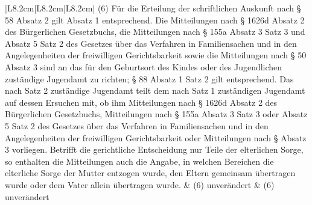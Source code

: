 \documentclass[10pt,a4paper,landscape]{article}
\begin{document}
\begin{longtable}{|L{8.2cm}|L{8.2cm}|L{8.2cm}|}
(6) Für die Erteilung der schriftlichen  \newline Auskunft nach \S{} 58 Absatz 2 gilt Absatz 1  \newline entsprechend. Die Mitteilungen nach \S{}  \newline 1626d Absatz 2 des Bürgerlichen  \newline Gesetzbuchs, die Mitteilungen nach \S{} 155a  \newline Absatz 3 Satz 3 und Absatz 5 Satz 2 des  \newline Gesetzes über das Verfahren in  \newline Familiensachen und in den  \newline Angelegenheiten der freiwilligen  \newline Gerichtsbarkeit sowie die Mitteilungen nach  \newline \S{} 50 Absatz 3 sind an das für den  \newline Geburtsort des Kindes oder des  \newline Jugendlichen zuständige Jugendamt zu  \newline richten; \S{} 88 Absatz 1 Satz 2 gilt  \newline entsprechend. Das nach Satz 2 zuständige  \newline Jugendamt teilt dem nach Satz 1  \newline zuständigen Jugendamt auf dessen  \newline Ersuchen mit, ob ihm Mitteilungen nach \S{}  \newline 1626d Absatz 2 des Bürgerlichen  \newline Gesetzbuchs, Mitteilungen nach \S{} 155a  \newline Absatz 3 Satz 3 oder Absatz 5 Satz 2 des  \newline Gesetzes über das Verfahren in  \newline Familiensachen und in den  \newline Angelegenheiten der freiwilligen  \newline Gerichtsbarkeit oder Mitteilungen nach \S{}   Absatz 3 vorliegen. Betrifft die  \newline gerichtliche Entscheidung nur Teile der  \newline elterlichen Sorge, so enthalten die  \newline Mitteilungen auch die Angabe, in welchen  \newline Bereichen die elterliche Sorge der Mutter  \newline entzogen wurde, den Eltern gemeinsam  \newline übertragen wurde oder dem Vater allein  \newline übertragen wurde. & (6) unverändert & (6) unverändert \\

\end{longtable}
\end{document}
